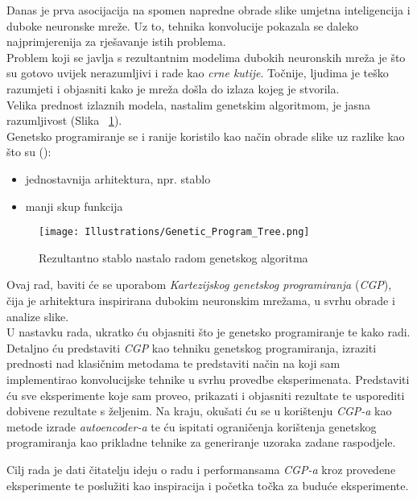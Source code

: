 Danas je prva asocijacija na spomen napredne obrade slike umjetna inteligencija i duboke neuronske mreže.
Uz to, tehnika konvolucije pokazala se daleko najprimjerenija za rješavanje istih problema. \\
Problem koji se javlja s rezultantnim modelima dubokih neuronskih mreža je što su gotovo uvijek nerazumljivi i rade kao \emph{crne kutije}.
Točnije, ljudima je teško razumjeti i objasniti kako je mreža došla do izlaza kojeg je stvorila. \\
Velika prednost izlaznih modela, nastalim genetskim algoritmom, je jasna razumljivost (Slika ~\ref{fig:gen_alg_tree_1}). \\
Genetsko programiranje se i ranije koristilo kao način obrade slike uz razlike kao što su (\cite{cgp_image_processing}):
\begin{itemize}
	\item jednostavnija arhitektura, npr. stablo
	\item manji skup funkcija
\end{itemize}

\begin{figure}
	\centering
	\texttt{[image: Illustrations/Genetic\_Program\_Tree.png]}
	\caption{Rezultantno stablo nastalo radom genetskog algoritma}
	\label{fig:gen_alg_tree_1}
\end{figure}

Ovaj rad, baviti će se uporabom \emph{Kartezijskog genetskog programiranja} (\emph{CGP}), čija je arhitektura inspirirana dubokim neuronskim mrežama, u svrhu obrade i analize slike. \\
U nastavku rada, ukratko ću objasniti što je genetsko programiranje te kako radi.
Detaljno ću predstaviti \emph{CGP} kao tehniku genetskog programiranja, izraziti prednosti nad klasičnim metodama te predstaviti način na koji sam implementirao konvolucijske tehnike u svrhu provedbe eksperimenata.
Predstaviti ću sve eksperimente koje sam proveo, prikazati i objasniti rezultate te usporediti dobivene rezultate s željenim.
Na kraju, okušati ću se u korištenju \emph{CGP-a} kao metode izrade \emph{autoencoder-a} te ću ispitati ograničenja korištenja genetskog programiranja kao prikladne tehnike za generiranje uzoraka zadane raspodjele.

Cilj rada je dati čitatelju ideju o radu i performansama \emph{CGP-a} kroz provedene eksperimente te poslužiti kao inspiracija i početka točka za buduće eksperimente.
